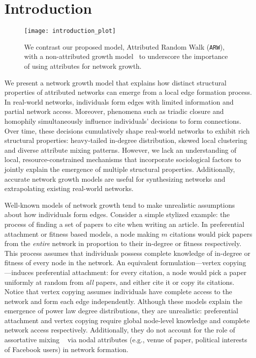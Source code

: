 \section{Introduction}
\label{sec:Introduction}

\begin{figure}
	\centering
	\texttt{[image: introduction\_plot]}
    \caption{We contrast our proposed model, Attributed Random Walk (\texttt{ARW}), with a non-attributed growth model~\cite{holme2002growing} to underscore the importance of using attributes for network growth.}
	\label{fig:intro_plot}
  \vspace{-20pt}
\end{figure}




We present a network growth model that explains how distinct
structural properties of attributed networks can emerge from a local edge
formation process. In real-world networks, individuals form edges
with limited information and partial network access.
Moreover, phenomena such as triadic closure and homophily
simultaneously influence individuals' decisions to form connections.
Over time, these decisions cumulatively shape real-world networks to exhibit
rich structural properties: heavy-tailed in-degree distribution, skewed
local clustering and diverse attribute mixing patterns. However, we lack an
understanding of local, resource-constrained mechanisms that incorporate
sociological factors to jointly explain the emergence of multiple structural properties.
Additionally, accurate network growth models are useful for synthesizing networks and extrapolating existing real-world networks.



Well-known models of network growth tend to make unrealistic assumptions about how
individuals form edges. Consider a simple stylized example: the process of
finding a set of papers to cite when writing an article. In preferential
attachment \cite{barabasi1999emergence} or fitness
\cite{bianconi2001bose,caldarelli2002scale,wang2013quantifying} based models, a
node making $m$ citations would pick papers from the \textit{entire} network in
proportion to their in-degree or fitness respectively. This process assumes that
individuals possess {complete} knowledge of in-degree or fitness of every node
in the network. An equivalent formulation---vertex copying
\cite{kumar2000stochastic}---induces preferential attachment: for every
citation, a node would pick a paper uniformly at random from \textit{all}
papers, and either cite it or copy its citations. Notice that vertex copying assumes individuals have complete access to the network and form each
edge independently. Although these models explain the emergence of power law
degree distributions, they are unrealistic: preferential attachment and vertex
copying require global node-level knowledge and complete network access respectively.
Additionally, they do not account for the role of assortative mixing ~\cite{newman2002assortative} via nodal attributes (e.g., venue of paper, political interests of Facebook users) in network formation.

